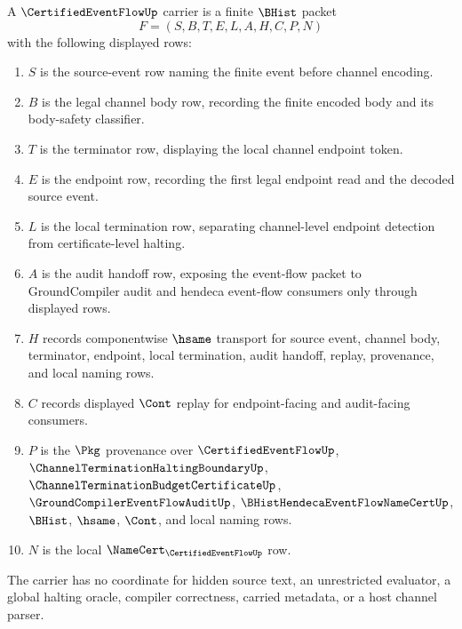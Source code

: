 \begin{definition}
\label{def:certified-event-flow-carrier}
A $\CertifiedEventFlowUp$ carrier is a finite $\BHist$ packet
$$
F=(S,B,T,E,L,A,H,C,P,N)
$$
with the following displayed rows:
\begin{enumerate}
\item $S$ is the source-event row naming the finite event before channel encoding.
\item $B$ is the legal channel body row, recording the finite encoded body and its body-safety classifier.
\item $T$ is the terminator row, displaying the local channel endpoint token.
\item $E$ is the endpoint row, recording the first legal endpoint read and the decoded source event.
\item $L$ is the local termination row, separating channel-level endpoint detection from certificate-level halting.
\item $A$ is the audit handoff row, exposing the event-flow packet to GroundCompiler audit and hendeca event-flow consumers only through displayed rows.
\item $H$ records componentwise $\hsame$ transport for source event, channel body, terminator, endpoint, local termination, audit handoff, replay, provenance, and local naming rows.
\item $C$ records displayed $\Cont$ replay for endpoint-facing and audit-facing consumers.
\item $P$ is the $\Pkg$ provenance over $\CertifiedEventFlowUp$, $\ChannelTerminationHaltingBoundaryUp$, $\ChannelTerminationBudgetCertificateUp$, $\GroundCompilerEventFlowAuditUp$, $\BHistHendecaEventFlowNameCertUp$, $\BHist$, $\hsame$, $\Cont$, and local naming rows.
\item $N$ is the local $\NameCert_{\CertifiedEventFlowUp}$ row.
\end{enumerate}
The carrier has no coordinate for hidden source text, an unrestricted evaluator, a global halting oracle, compiler correctness, carried metadata, or a host channel parser.
\end{definition}

